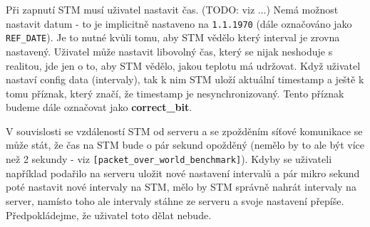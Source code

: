 Při zapnutí STM musí uživatel nastavit čas. (TODO: viz ...)
Nemá možnost nastavit datum - to je implicitně nastaveno na \texttt{1.1.1970} (dále označováno jako \texttt{REF\_DATE}).
Je to nutné kvůli tomu, aby STM vědělo který interval je zrovna nastavený.
Uživatel může nastavit libovolný čas, který se nijak neshoduje s realitou, jde jen o to,
aby STM vědělo, jakou teplotu má udržovat.
Když uživatel nastaví config data (intervaly), tak k nim STM uloží aktuální timestamp
a ještě k tomu příznak, který značí, že timestamp je nesynchronizovaný.
Tento příznak budeme dále označovat jako \textbf{correct\_bit}.

V souvislosti se vzdáleností STM od serveru a se zpožděním síťové komunikace se může
stát, že čas na STM bude o pár sekund opožděný (nemělo by to ale být více než 2 sekundy -
viz \texttt{[packet\_over\_world\_benchmark]}).
Kdyby se uživateli například podařilo na serveru uložit nové nastavení intervalů
a pár mikro sekund poté nastavit nové intervaly na STM, mělo by STM správně nahrát
intervaly na server, namísto toho ale intervaly stáhne ze serveru a svoje nastavení přepíše.
Předpokládejme, že uživatel toto dělat nebude.


